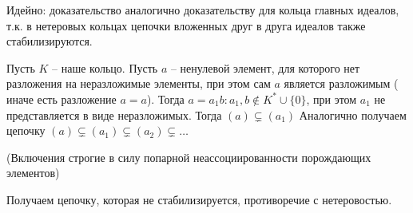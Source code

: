 Идейно: доказательство аналогично доказательству для кольца главных идеалов, т.к. в нетеровых кольцах цепочки вложенных друг в друга идеалов также стабилизируются.

\Proof
Пусть $K$ -- наше кольцо.
Пусть $a$ -- ненулевой элемент, для которого нет разложения на неразложимые элементы, при этом сам $a$ является разложимым ( иначе есть разложение $a = a$). Тогда $a = a_1b : a_1, b \not\in K^*\cup\{0\}$, при этом $a_1$ не представляется в виде неразложимых. Тогда $(a) \varsubsetneq (a_1)$ Аналогично получаем
цепочку $(a) \varsubsetneq (a_1) \varsubsetneq (a_2) \varsubsetneq \ldots$

(Включения строгие в силу попарной неассоциированности порождающих элементов)

Получаем цепочку, которая не стабилизируется, противоречие с нетеровостью.

\EndProof